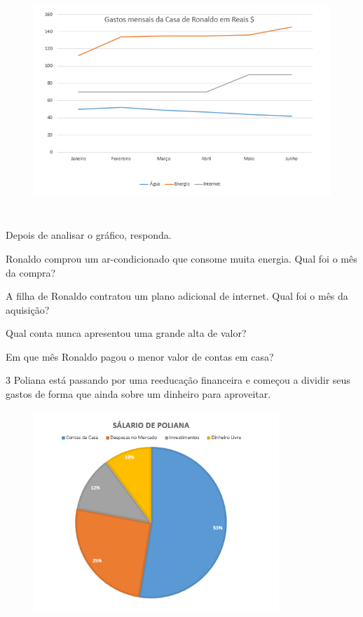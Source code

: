 \begin{figure}[H]
\centering\includegraphics[width=5.30833in,height=3.41384in]{./imgSAEB_8_MAT/media/image40.png}
\end{figure}

Depois de analisar o gráfico, responda.

\begin{escolha}[itemsep=0pt]
\item Ronaldo comprou um ar-condicionado que consome muita energia. Qual foi o mês da compra?


\item A filha de Ronaldo contratou um plano adicional de internet. Qual foi o mês da aquisição?


\item Qual conta nunca apresentou uma grande alta de valor?


\item Em que mês Ronaldo pagou o menor valor de contas em casa?

\end{escolha}


\num{3} Poliana está passando por uma reeducação financeira e começou a
dividir seus gastos de forma que ainda sobre um dinheiro para
aproveitar.

\begin{figure}[H]
\centering\includegraphics[width=3.65in,height=2.98179in]{./imgSAEB_8_MAT/media/image41.png}
\end{figure}

